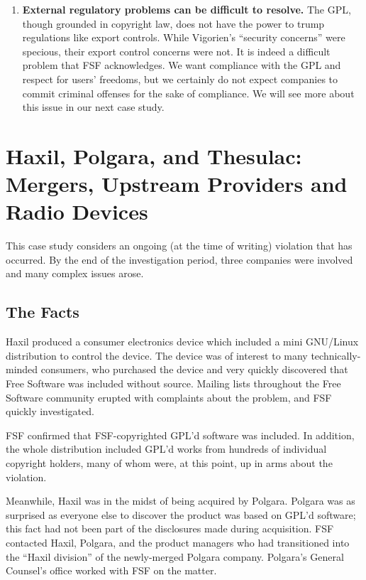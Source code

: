 \begin{enumerate}
\item {\bf External regulatory problems can be difficult to resolve.}
  The GPL, though grounded in copyright law, does not have the power to trump
  regulations like export controls. While Vigorien's ``security
  concerns'' were specious, their export control concerns were not. It is
  indeed a difficult problem that FSF acknowledges. We want compliance
  with the GPL and respect for users' freedoms, but we certainly do not expect
  companies to commit criminal offenses for the sake of compliance. We
  will see more about this issue in our next case study.
\end{enumerate}


\chapter{Haxil, Polgara, and Thesulac: Mergers, Upstream Providers and Radio Devices}

This case study considers an ongoing (at the time of writing) violation
that has occurred. By the end of the investigation period, three
companies were involved and many complex issues arose.

\section{The Facts}

Haxil produced a consumer electronics device which included a mini
GNU/Linux distribution to control the device. The device was of interest
to many technically-minded consumers, who purchased the device and very
quickly discovered that Free Software was included without source.
Mailing lists throughout the Free Software community erupted with
complaints about the problem, and FSF quickly investigated.

FSF confirmed that FSF-copyrighted GPL'd software was included. In
addition, the whole distribution included GPL'd works from hundreds of
individual copyright holders, many of whom were, at this point, up in
arms about the violation.

Meanwhile, Haxil was in the midst of being acquired by Polgara. Polgara
was as surprised as everyone else to discover the product was based on
GPL'd software; this fact had not been part of the disclosures made during
acquisition. FSF contacted Haxil, Polgara, and the product managers
who had transitioned into the ``Haxil division'' of the newly-merged
Polgara company. Polgara's General Counsel's office worked with FSF on
the matter.

